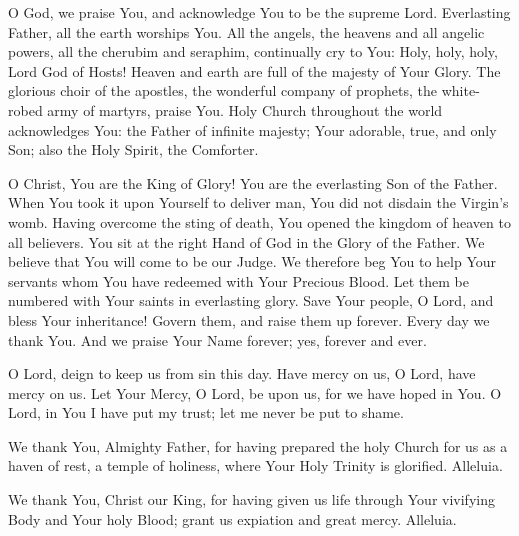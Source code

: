 O God, we praise You, and acknowledge You to be the supreme Lord.
Everlasting Father, all the earth worships You.
All the angels, the heavens and all angelic powers, all the cherubim and seraphim, continually cry to You:
Holy, holy, holy, Lord God of Hosts!
Heaven and earth are full of the majesty of Your Glory.
The glorious choir of the apostles, the wonderful company of prophets, the white-robed army of martyrs, praise You.
Holy Church throughout the world acknowledges You:
the Father of infinite majesty;
Your adorable, true, and only Son;
also the Holy Spirit, the Comforter.

O Christ, You are the King of Glory!
You are the everlasting Son of the Father.
When You took it upon Yourself to deliver man, You did not disdain the Virgin's womb.
Having overcome the sting of death, You opened the kingdom of heaven to all believers.
You sit at the right Hand of God in the Glory of the Father.
We believe that You will come to be our Judge.
We therefore beg You to help Your servants whom You have redeemed with Your Precious Blood.
Let them be numbered with Your saints in everlasting glory.
Save Your people, O Lord, and bless Your inheritance!
Govern them, and raise them up forever.
Every day we thank You.
And we praise Your Name forever;
yes, forever and ever.

O Lord, deign to keep us from sin this day.
Have mercy on us, O Lord, have mercy on us.
Let Your Mercy, O Lord, be upon us, for we have hoped in You.
O Lord, in You I have put my trust;
let me never be put to shame.

We thank You, Almighty Father, for having prepared the holy Church for us as a haven
of rest, a temple of holiness, where Your Holy Trinity is glorified. Alleluia.

We thank You, Christ our King, for having given us life through Your vivifying Body
and Your holy Blood; grant us expiation and great mercy. Alleluia.

